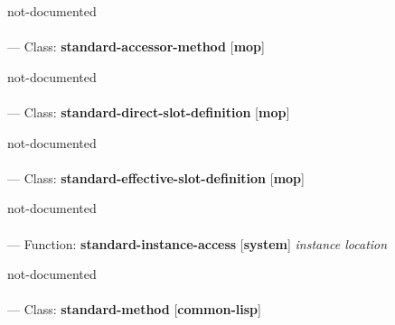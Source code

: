\begin{adjustwidth}{5em}{5em}
not-documented
\end{adjustwidth}

\paragraph{}
\label{MOP:STANDARD-ACCESSOR-METHOD}
--- Class: \textbf{standard-accessor-method} [\textbf{mop}] \textit{}

\begin{adjustwidth}{5em}{5em}
not-documented
\end{adjustwidth}

\paragraph{}
\label{MOP:STANDARD-DIRECT-SLOT-DEFINITION}
--- Class: \textbf{standard-direct-slot-definition} [\textbf{mop}] \textit{}

\begin{adjustwidth}{5em}{5em}
not-documented
\end{adjustwidth}

\paragraph{}
\label{MOP:STANDARD-EFFECTIVE-SLOT-DEFINITION}
--- Class: \textbf{standard-effective-slot-definition} [\textbf{mop}] \textit{}

\begin{adjustwidth}{5em}{5em}
not-documented
\end{adjustwidth}

\paragraph{}
\label{SYSTEM:STANDARD-INSTANCE-ACCESS}
--- Function: \textbf{standard-instance-access} [\textbf{system}] \textit{instance location}

\begin{adjustwidth}{5em}{5em}
not-documented
\end{adjustwidth}

\paragraph{}
\label{COMMON-LISP:STANDARD-METHOD}
--- Class: \textbf{standard-method} [\textbf{common-lisp}] \textit{}


